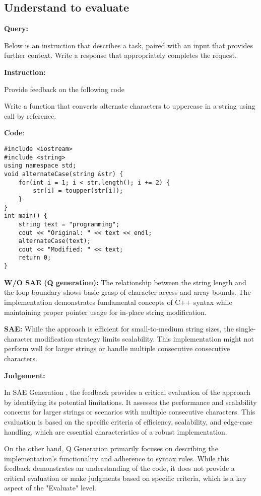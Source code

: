 \medskip
\subsection*{Understand to evaluate}

\textbf{Query:}

Below is an instruction that describes a task, paired with an input that provides further context. Write a response that appropriately completes the request.\par
\textbf{Instruction:}\par
Provide feedback on the following code \par
Write a function that converts alternate characters to uppercase in a string using call by reference. \par

\textbf{Code}:
\begin{lstlisting}
#include <iostream>
#include <string>
using namespace std;
void alternateCase(string &str) {
    for(int i = 1; i < str.length(); i += 2) {
        str[i] = toupper(str[i]);
    }
}
int main() {
    string text = "programming";
    cout << "Original: " << text << endl;
    alternateCase(text);
    cout << "Modified: " << text;
    return 0;
}
\end{lstlisting}
\textbf{W/O SAE (Q generation):} The relationship between the string length and the loop boundary shows basic grasp of character access and array bounds. The implementation demonstrates fundamental concepts of C++ syntax while maintaining proper pointer usage for in-place string modification. \par

\textbf{SAE:}  While the approach is efficient for small-to-medium string sizes, the single-character modification strategy limits scalability. This implementation might not perform well for larger strings or handle multiple consecutive consecutive characters.  \par
\textbf{Judgement:} 

In SAE Generation , the feedback provides a critical evaluation of the approach by identifying its potential limitations. It assesses the performance and scalability concerns for larger strings or scenarios with multiple consecutive characters. This evaluation is based on the specific criteria of efficiency, scalability, and edge-case handling, which are essential characteristics of a robust implementation.


On the other hand, Q Generation  primarily focuses on describing the implementation's functionality and adherence to syntax rules. While this feedback demonstrates an understanding of the code, it does not provide a critical evaluation or make judgments based on specific criteria, which is a key aspect of the "Evaluate" level.







